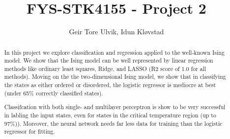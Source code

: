\documentclass[12pt, notitlepage]{article}
\begin{document}
\title{FYS-STK4155 - Project 2}
\author{Geir Tore Ulvik, Idun Kløvstad}
\begin{titlingpage}
    \maketitle
    \begin{abstract}
    In this project we explore classification and regression applied to
    the well-known Ising model. We show that the Ising model can be well
    represented by linear regression methods like ordinary least squares,
    Ridge, and LASSO (R2 score of 1.0 for all methods). 
    Moving on the the two-dimensional Ising model, we show that
    in classifying the states as either ordered or disordered, the logistic
    regressor is mediocre at best (under 65\% correctly classified states).

    Classifcation with both single- and multilayer perceptron is show to be very
    successful in labling the input states, even for states in the critical
    temperature region (up to 97\%)). Moreover, the neural network needs far 
    less data for training than the logistic regressor for fitting.
    \end{abstract}
\end{titlingpage}






\appendix


\end{document}
